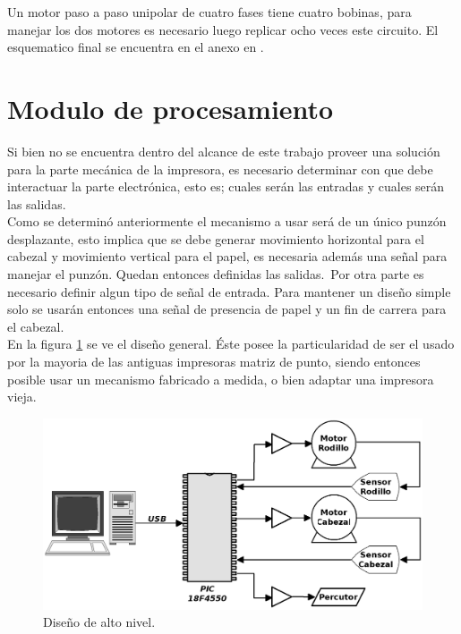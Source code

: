 Un motor paso a paso unipolar de cuatro fases tiene cuatro bobinas, para
manejar los dos motores es necesario luego replicar ocho veces este circuito.
El esquematico final se encuentra en el anexo en .\\

\section{Modulo de procesamiento}
Si bien no se encuentra dentro del alcance de este trabajo proveer una
soluci\'on para la parte mec\'anica de la impresora, es necesario determinar
con que debe interactuar la parte electr\'onica, esto es; cuales ser\'an las
entradas y cuales ser\'an las salidas.\\

Como se determin\'o anteriormente el mecanismo a usar ser\'a de un \'unico
punz\'on desplazante, esto implica que se debe generar movimiento horizontal
para el cabezal y movimiento vertical para el papel, es necesaria adem\'as una
se\~nal para manejar el punz\'on. Quedan entonces definidas las salidas.\
Por otra parte es necesario definir algun tipo de se\~nal de entrada. Para
mantener un dise\~no simple solo se usar\'an entonces una se\~nal de presencia
de papel y un fin de carrera para el cabezal.\\

En la figura \ref{fig:pc_uc_motors} se ve el dise\~no general. \'Este posee la
particularidad de ser el usado por la mayoria de las antiguas impresoras
matriz de punto, siendo entonces posible usar un mecanismo fabricado a medida,
o bien adaptar una impresora vieja.


\begin{figure}[htp]
\centering
\includegraphics[width=13cm]{./img/pc_uc_motors.png}
\caption{Dise\~no de alto nivel.}
\label{fig:pc_uc_motors}
\end{figure}


